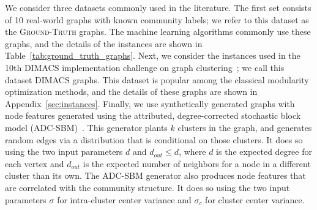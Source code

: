 \documentclass[../paper.tex]{subfiles}
\begin{document}
We consider three datasets commonly used in the literature. The first set consists of 10 real-world graphs with known community labels; we refer to this dataset as the \textsc{Ground-Truth} graphs. The machine learning algorithms commonly use these graphs, and the details of the instances are shown in Table~\ref{tab:ground_truth_graphs}. Next, we consider the instances used in the 10th DIMACS implementation challenge on graph clustering~\cite{dimacschallengegraphpartandcluster}; we call this dataset \textsc{DIMACS} graphs. This dataset is popular among the classical modularity optimization methods, and the details of these graphs are shown in Appendix~\ref{sec:instances}. Finally, we use synthetically generated graphs with node features generated using the attributed, degree-corrected stochastic block model (ADC-SBM)~\cite{adcsbm2022}. This generator plants $k$ clusters in the graph, and generates random edges via a distribution that is conditional on those clusters. It does so using the two input parameters $d$ and $d_{out} \leq d$, where $d$ is the expected degree for each vertex and $d_{out}$ is the expected number of neighbors for a node in a different cluster than its own. The ADC-SBM generator also produces node features that are correlated with the community structure. It does so using the two input parameters $\sigma$ for intra-cluster center variance and $\sigma_c$ for cluster center variance.



\ifSubfilesClassLoaded{%
}{}
\end{document}
